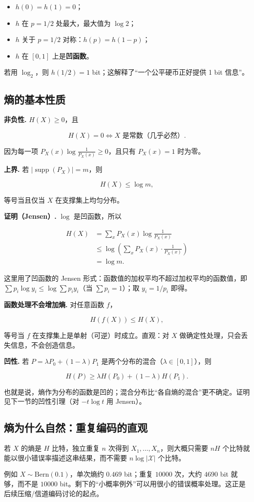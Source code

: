 \begin{itemize}
\item $h(0)=h(1)=0$；
\item $h$ 在 $p=1/2$ 处最大，最大值为 $\log2$；
\item $h$ 关于 $p=1/2$ 对称：$h(p)=h(1-p)$；
\item $h$ 在 $[0,1]$ 上是\textbf{凹函数}。
\end{itemize}


若用 $\log_2$，则 $h(1/2)=1$ bit；这解释了“一个公平硬币正好提供 1 bit 信息”。

\subsection{熵的基本性质}


\textbf{非负性.} $H(X)\ge0$，且

\[
H(X)=0
\iff X\text{ 是常数（几乎必然）}.
\]

因为每一项 $P_X(x)\log\frac1{P_X(x)}\ge0$，且只有 $P_X(x)=1$ 时为零。

\textbf{上界.} 若 $|\operatorname{supp}(P_X)|=m$，则

\[
H(X)\le\log m,
\]

等号当且仅当 $X$ 在支撑集上均匀分布。

\textbf{证明（Jensen）.} $\log$ 是凹函数，所以

\[
\begin{aligned}
H(X)
&=\sum_xP_X(x)\log\frac1{P_X(x)}\\
&\le\log\left(\sum_xP_X(x)\cdot\frac1{P_X(x)}\right)\\
&=\log m.
\end{aligned}
\]

这里用了凹函数的 Jensen 形式：函数值的加权平均不超过加权平均的函数值，即 $\sum p_i\log y_i\le\log\sum p_i y_i$（当 $\sum p_i=1$）；取 $y_i=1/p_i$ 即得。

\textbf{函数处理不会增加熵.} 对任意函数 $f$，

\[
H(f(X))\le H(X),
\]

等号当 $f$ 在支撑集上是单射（可逆）时成立。直观：对 $X$ 做确定性处理，只会丢失信息，不会创造信息。

\textbf{凹性.} 若 $P=\lambda P_0+(1-\lambda)P_1$ 是两个分布的混合（$\lambda\in[0,1]$），则

\[
H(P)\ge\lambda H(P_0)+(1-\lambda)H(P_1).
\]

也就是说，熵作为分布的函数是凹的；混合分布比“各自熵的混合”更不确定。证明见下一节的凹性引理（对 $-t\log t$ 用 Jensen）。

\subsection{熵为什么自然：重复编码的直观}


若 $X$ 的熵是 $H$ 比特，独立重复 $n$ 次得到 $X_1,\dots,X_n$，则大概只需要 $nH$ 个比特就能以很小错误率描述这串结果，而不需要 $n\log|\mathcal X|$ 个比特。

例如 $X\sim\mathrm{Bern}(0.1)$，单次熵约 $0.469$ bit；重复 $10000$ 次，大约 $4690$ bit 就够，而不是 $10000$ bit。剩下的“小概率例外”可以用很小的错误概率处理。这正是后续压缩/信道编码讨论的起点。
